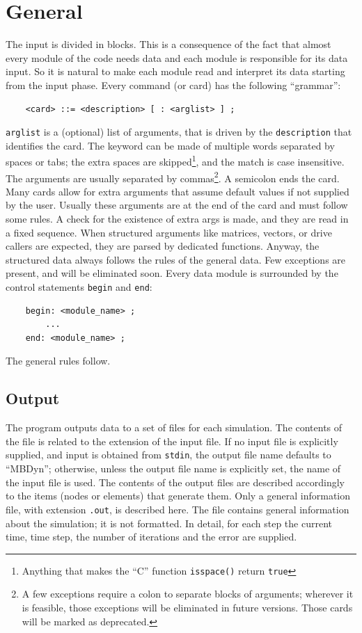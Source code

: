 \documentclass[10pt,dvips]{report}
\begin{document}
\chapter{General}
The input is divided in blocks. 
This is a consequence of the fact that almost every module of the code 
needs data and each module is responsible for its data input. 
So it is natural to make each module read and interpret its data starting 
from the input phase.
Every command (or card) has the following ``grammar'':
\begin{verbatim}
    <card> ::= <description> [ : <arglist> ] ;
\end{verbatim}
{\tt arglist} is a (optional) list of arguments, that is driven by the 
{\tt description} that identifies the card. 
The keyword can be made of multiple words separated by spaces or tabs; 
the extra spaces are skipped\footnote{
    Anything that makes the ``C'' function {\tt isspace()} return {\tt true}
}, and the match is case insensitive. 
The arguments are usually separated by commas\footnote{
    A few exceptions require a colon to separate blocks of arguments;
    wherever it is feasible, those exceptions will be eliminated in future
    versions. Those cards will be marked as deprecated.
}.
A semicolon ends the card. 
Many cards allow for extra arguments that assume default values 
if not supplied by the user. 
Usually these arguments are at the end of the card and must follow some 
rules. 
A check for the existence of extra args is made, and they are read in a 
fixed sequence.
When structured arguments like matrices, vectors, or drive callers are
expected, they are parsed by dedicated functions.
Anyway, the structured data always follows the rules of the general data. 
Few exceptions are present, and will be eliminated soon.
Every data module is surrounded by the control statements {\tt begin} and
{\tt end}:
\begin{verbatim}
    begin: <module_name> ;
        ...
    end: <module_name> ;
\end{verbatim}
The general rules follow.



\section{Output}
The program outputs data to a set of files for each simulation.
The contents of the file is related to the extension of the input file.
If no input file is explicitly supplied, and input is obtained from 
{\tt stdin}, the output file name defaults to ``MBDyn''; otherwise, unless
the output file name is explicitly set, the name of the input file is used.
The contents of the output files are described accordingly to the items
(nodes or elements) that generate them.
Only a general information file, with extension {\tt .out}, is described
here. 
The file contains general information about the simulation; it is not
formatted. 
In detail, for each step the current time, time step, the number of
iterations and the error are supplied.
\end{document}

